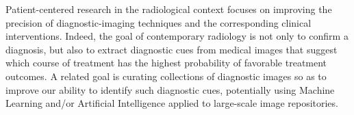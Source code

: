 \documentclass[11pt,letterpaper]{article}
\newcommand{\p}[1]{

\vspace{1em}#1}
\newcommand{\llMOSAIC}{\mbox{{\LARGE MOSAIC}}}
\newcommand{\llWC}{\mbox{{\LARGE WhiteCharmDB}}}
\begin{document}
\setlength{\skip\footins}{18pt}	
	
{\linespread{1.25}\selectfont

\vspace*{1.5em}

\begin{center}






\begin{tcolorbox}
[
arc=2pt,outer arc=0pt,
enhanced jigsaw,
width=\textwidth,
colback=ctmppppy!40,
colframe=logoRed!30!darkRed,
drop shadow=logoPurple!50!darkRed,
]
\begin{minipage}{\textwidth}	
\begin{center}	
{\setlength{\fboxsep}{32pt}
	}
\end{center}
\end{minipage}
\end{tcolorbox}
\end{center}

\p{Patient-centered research in the radiological 
context focuses on improving the precision of 
diagnostic-imaging techniques and the corresponding 
clinical interventions.  Indeed, the goal of contemporary 
radiology is not only to confirm a diagnosis, 
but also to extract diagnostic cues from 
medical images that suggest which course of 
treatment has the highest probability of 
favorable treatment outcomes.  A related 
goal is curating collections of diagnostic 
images so as to improve our ability to 
identify such diagnostic cues, potentially 
using Machine Learning and/or Artificial 
Intelligence applied to large-scale 
image repositories.}

}
\end{document}
